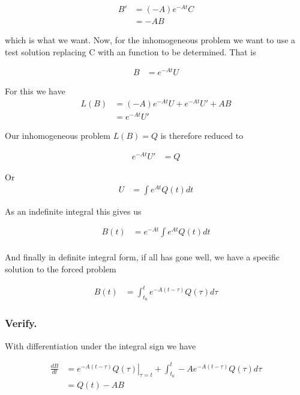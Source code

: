 \documentclass{article}
\begin{document}
\begin{align*}
B' 
&= (-A) e^{-At} C \\
&= -A B 
\end{align*}

which is what we want.  Now, for the inhomogeneous problem we want to use a test solution replacing C with an function to be determined.  That is

\begin{align*}
B &= e^{-At} U
\end{align*}

For this we have
\begin{align*}
L(B) 
&= (-A) e^{-At} U + e^{-At} U' + A B  \\
&= e^{-At} U'
\end{align*}

Our inhomogeneous problem $L(B) = Q$ is therefore reduced to

\begin{align*}
e^{-At} U' &= Q
\end{align*}

Or 
\begin{align*}
U &= \int e^{A t} Q(t) dt
\end{align*}

As an indefinite integral this gives us

\begin{align*}
B(t)
&= e^{-At} \int e^{A t} Q(t) dt \\
\end{align*}

And finally in definite integral form,
if all has gone well, we have a specific solution to the forced problem

\begin{align}\label{eqn:linearSolved}
B(t) &= \int_{t_0}^{t} e^{-A (t -\tau)} Q(\tau) d\tau 
\end{align}

\subsubsection{ Verify. }

With differentiation under the integral sign we have

\begin{align*}
\frac{dB}{dt} 
&={\left. e^{-A (t -\tau)} Q(\tau) \right\vert}_{\tau=t} + \int_{t_0}^{t} -A e^{-A (t -\tau)} Q(\tau) d\tau \\
&= Q(t) - A B
\end{align*}
\end{document}
